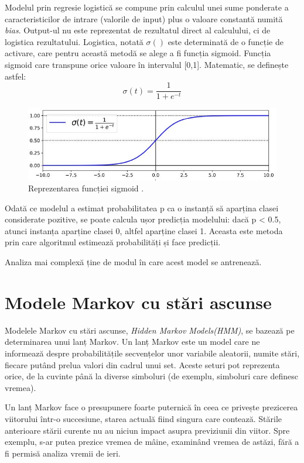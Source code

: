 \documentclass[a4paper,12pt]{report}
\begin{document}
    Modelul prin regresie logistică se compune prin calculul unei sume ponderate a caracteristicilor de intrare
    (valorile de input) plus o valoare constantă numită \emph{bias}. Output-ul nu este reprezentat de rezultatul
    direct al calculului, ci de logistica rezultatului. Logistica, notată $\sigma()$ este determinată de o
    funcție de activare, care pentru această metodă se alege a fi funcția sigmoid. Funcția sigmoid 
    care transpune orice valoare în intervalul [0,1]. Matematic, se definește astfel:
    \begin{equation*}
        \sigma(t) = \frac{1}{1 + e ^ {-t}}
    \end{equation*}
    
    \begin{figure}[h!]
        \centering
        \includegraphics[width=12cm]{..//resources//images//sigmoid.jpg} 
        \caption{Reprezentarea funcției sigmoid \cite{Hands-On-Machine-Learning}.} 
    \end{figure}
    Odată ce modelul a estimat probabilitatea p ca o instanță să aparțina clasei considerate pozitive, se poate 
    calcula ușor predicția modelului: dacă p < 0.5, atunci instanța aparține clasei 0, altfel aparține clasei 1.
    Aceasta este metoda prin care algoritmul estimează probabilități și face predicții.

    Analiza mai complexă ține de modul în care acest model se antrenează. 
\fi
\section{Modele Markov cu stări ascunse}
Modelele Markov cu stări ascunse, \emph{Hidden Markov Models(HMM)}, se bazează pe determinarea 
unui lanț Markov. Un lanț Markov este un model care ne informează despre probabilitățile secvențelor
unor variabile aleatorii, numite stări, fiecare putând prelua valori din cadrul unui set. Aceste 
seturi pot reprezenta orice, de la cuvinte până la diverse simboluri (de exemplu, simboluri
care definesc vremea). 

Un lanț Markov face o presupunere foarte puternică în ceea ce privește prezicerea viitorului 
într-o succesiune, starea actuală fiind singura care contează. Stările anterioare stării curente
nu au niciun impact asupra previziunii din viitor. Spre exemplu, s-ar putea prezice vremea de mâine, 
examinând vremea de astăzi, fără a fi permisă analiza vremii de ieri.
\end{document}
